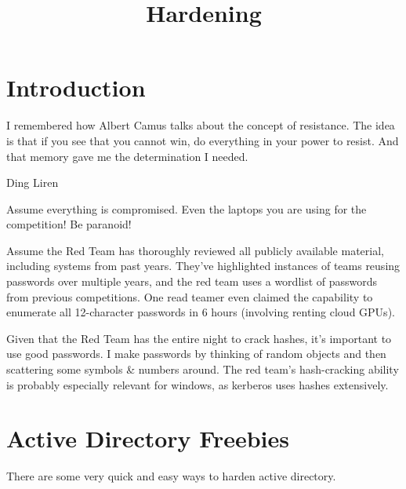 \documentclass{article}
\title{Hardening}
\begin{document}
\maketitle

\graphicspath{ {./Images/} }
\tableofcontents

\section{Introduction}
\epigraph{I remembered how Albert Camus talks about the concept of resistance. 
The idea is that if you see that you cannot win, do everything in your power to resist. And that memory gave me the determination I needed.}
{Ding Liren}

Assume everything is compromised. Even the laptops you are using for the competition! Be paranoid!

Assume the Red Team has thoroughly reviewed all publicly available material, 
including systems from past years. They've highlighted instances of 
teams reusing passwords over multiple years, and the red team uses a wordlist of 
passwords from previous competitions. One read teamer even claimed the capability to 
enumerate all 12-character passwords in 6 hours (involving renting cloud GPUs). 

Given that the Red Team has 
the entire night to crack hashes, it's important to use good passwords.
I make passwords by thinking of random objects and then scattering some symbols \& numbers around.
The red team's hash-cracking ability is probably especially relevant for windows, 
as kerberos uses hashes extensively. 

\section{Active Directory Freebies}
There are some very quick and easy ways to harden active directory.
\end{document}
